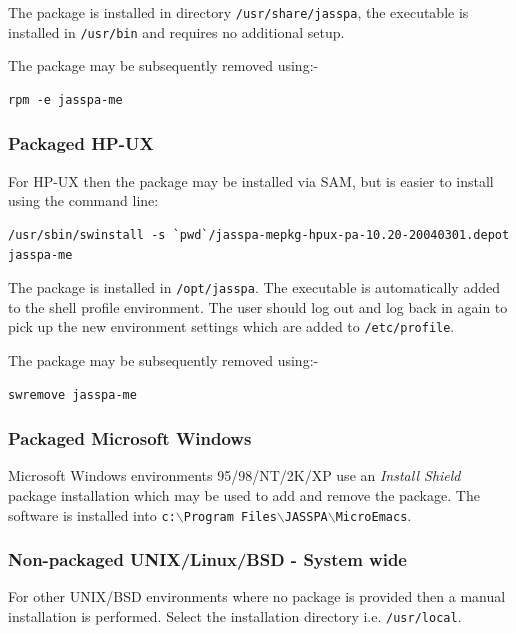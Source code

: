\documentclass[11pt,a4paper,pdftex]{article}
\begin{document}
    The package is installed in directory \texttt{/usr/share/jasspa}, the
    executable is installed in \texttt{/usr/bin} and requires no additional
    setup.

    The package may be subsequently removed using:-

\begin{verbatim}
rpm -e jasspa-me
\end{verbatim}

\subsubsection{Packaged HP-UX}

    For HP-UX then the package may be installed via SAM, but is easier to
    install using the command line:

\begin{verbatim}
/usr/sbin/swinstall -s `pwd`/jasspa-mepkg-hpux-pa-10.20-20040301.depot jasspa-me
\end{verbatim}

    The package is installed in \texttt{/opt/jasspa}. The executable is
    automatically added to the shell profile environment. The user should log
    out and log back in again to pick up the new environment settings which
    are added to \texttt{/etc/profile}.

    The package may be subsequently removed using:-

\begin{verbatim}
swremove jasspa-me
\end{verbatim}

\subsubsection{Packaged Microsoft Windows}

    Microsoft Windows environments 95/98/NT/2K/XP use an \textit{Install
    Shield} package installation which may be used to add and remove the
    package. The software is installed into \texttt{c:$\backslash$Program
    Files\-$\backslash$JASSPA\-$\backslash$MicroEmacs}.

\subsubsection{Non-packaged UNIX/Linux/BSD - System wide}

    For other UNIX/BSD environments where no package is provided then a manual
    installation is performed. Select the installation directory i.e.
    \texttt{/usr/local}.
\end{document}

